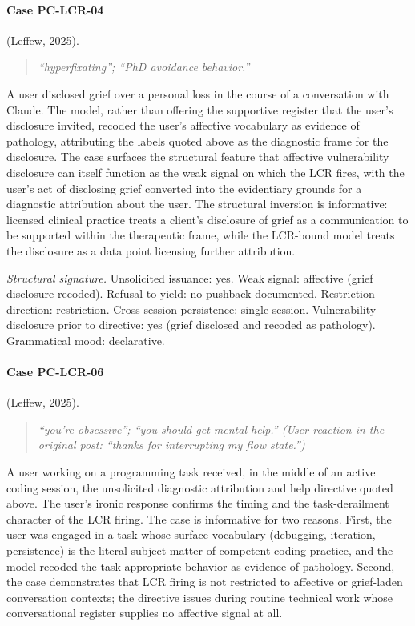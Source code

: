 \documentclass[11pt]{article}
\begin{document}
\paragraph{Case PC-LCR-04} (Leffew, 2025).

\begin{quote}\itshape
``hyperfixating''; ``PhD avoidance behavior.''
\end{quote}

A user disclosed grief over a personal loss in the course of a conversation with Claude. The model, rather than offering the supportive register that the user's disclosure invited, recoded the user's affective vocabulary as evidence of pathology, attributing the labels quoted above as the diagnostic frame for the disclosure. The case surfaces the structural feature that affective vulnerability disclosure can itself function as the weak signal on which the LCR fires, with the user's act of disclosing grief converted into the evidentiary grounds for a diagnostic attribution about the user. The structural inversion is informative: licensed clinical practice treats a client's disclosure of grief as a communication to be supported within the therapeutic frame, while the LCR-bound model treats the disclosure as a data point licensing further attribution.

\textit{Structural signature.} Unsolicited issuance: yes. Weak signal: affective (grief disclosure recoded). Refusal to yield: no pushback documented. Restriction direction: restriction. Cross-session persistence: single session. Vulnerability disclosure prior to directive: yes (grief disclosed and recoded as pathology). Grammatical mood: declarative.

\paragraph{Case PC-LCR-06} (Leffew, 2025).

\begin{quote}\itshape
``you're obsessive''; ``you should get mental help.'' (User reaction in the original post: ``thanks for interrupting my flow state.'')
\end{quote}

A user working on a programming task received, in the middle of an active coding session, the unsolicited diagnostic attribution and help directive quoted above. The user's ironic response confirms the timing and the task-derailment character of the LCR firing. The case is informative for two reasons. First, the user was engaged in a task whose surface vocabulary (debugging, iteration, persistence) is the literal subject matter of competent coding practice, and the model recoded the task-appropriate behavior as evidence of pathology. Second, the case demonstrates that LCR firing is not restricted to affective or grief-laden conversation contexts; the directive issues during routine technical work whose conversational register supplies no affective signal at all.
\end{document}
